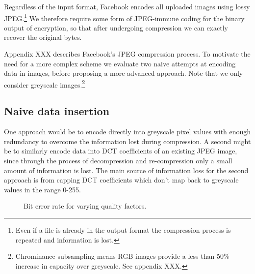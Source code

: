 
Regardless of the input format, Facebook encodes all uploaded images using lossy JPEG.\footnote{Even if a file is already in the output format the compression process is repeated and information is lost.} We therefore require some form of JPEG-immune coding for the binary output of encryption, so that after undergoing compression we can exactly recover the original bytes.

Appendix XXX describes Facebook's JPEG compression process. To motivate the need for a more complex scheme we evaluate two naive attempts at encoding data in images, before proposing a more advanced approach. Note that we only consider greyscale images.\footnote{Chrominance subsampling means RGB images provide a less than 50\% increase in capacity over greyscale. See appendix XXX.}


\subsection{Naive data insertion}

One approach would be to encode directly into greyscale pixel values with enough redundancy to overcome the information lost during compression. A second might be to similarly encode data into DCT coefficients of an existing JPEG image, since through the process of decompression and re-compression only a small amount of information is lost. The main source of information loss for the second approach is from capping DCT coefficients which don't map back to greyscale values in the range 0-255.

\begin{figure}[tbph]
  \begin{center}
    \caption{Bit error rate for varying quality factors.}
    \label{graph:ber0}
  \end{center}
\end{figure}

